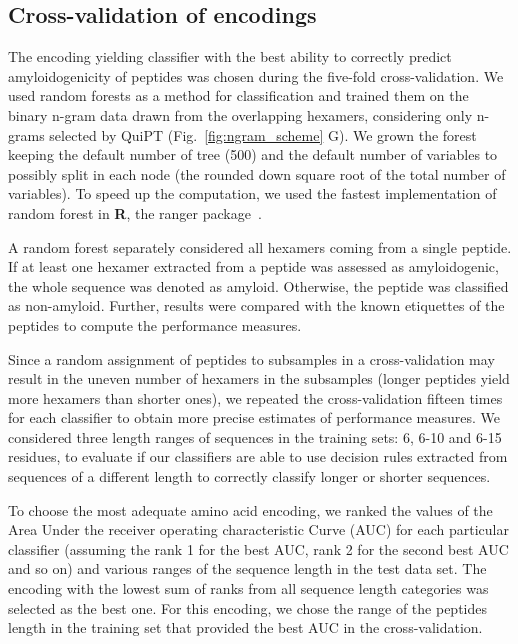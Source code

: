 \documentclass[fleqn,10pt,twoside]{gcb15submission}
\begin{document}
\subsection{Cross-validation of encodings}

The encoding yielding classifier with the best ability to correctly predict 
amyloidogenicity of peptides was chosen during the five-fold cross-validation. 
We used random forests as a method for classification and trained them on the 
binary n-gram data drawn from the overlapping hexamers, considering only n-grams 
selected by QuiPT (Fig.~\ref{fig:ngram_scheme} G). We grown the forest keeping 
the default number of tree (500) and the default number of variables to possibly 
split in each node (the rounded down square root of the total number of 
variables). To speed up the computation, we used the fastest implementation of 
random forest in \textbf{R}, the ranger package~\citep{wright_ranger:_2015}.

  A random forest separately considered all hexamers coming from a single 
peptide. If at least one hexamer extracted from a peptide was assessed as 
amyloidogenic, the whole sequence was denoted as amyloid. Otherwise, the peptide 
was classified as non-amyloid. Further, results were compared with the known 
etiquettes of the peptides to compute the performance measures.

  Since a random assignment of peptides to subsamples in a cross-validation may 
result in the uneven number of hexamers in the subsamples (longer peptides yield 
more hexamers than shorter ones), we repeated the cross-validation fifteen times 
for each classifier to obtain more precise estimates of performance measures. We 
considered three length ranges of sequences in the training sets: 6, 6-10 and 
6-15 residues, to evaluate if our classifiers are able to use decision rules 
extracted from sequences of a different length to correctly classify longer or 
shorter sequences. 

  To choose the most adequate amino acid encoding, we ranked the values of the 
Area Under the receiver operating characteristic Curve (AUC) for each particular 
classifier (assuming the rank 1 for the best AUC, rank 2 for the second best AUC 
and so on) and various ranges of the sequence length in the test data set. The 
encoding with the lowest sum of ranks from all sequence length categories was 
selected as the best one. For this encoding, we chose the range of the peptides 
length in the training set that provided the best AUC in the cross-validation. 
\end{document}
